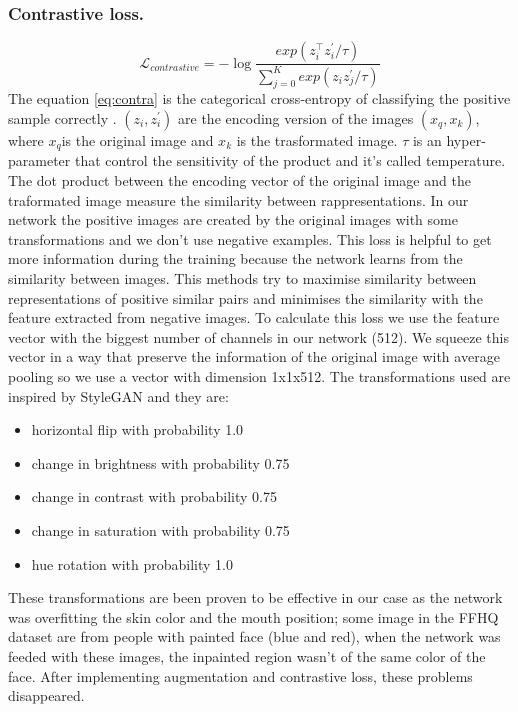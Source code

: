\documentclass[10pt,twocolumn,letterpaper]{article}
\begin{document}
\subsubsection{Contrastive loss.}
\begin{dmath}\label{eq:contra}
    \mathcal{L}_{contrastive} = - \log{\frac{exp(z_{i}^\intercal
    z_{i}^{'}/\tau)}{\sum_{j=0}^{K}exp(z_{i}z_{j}^{'}/\tau)}}
\end{dmath}
The equation \eqref{eq:contra} is the categorical cross-entropy of classifying
the positive sample correctly \cite{oord2018representation}. \((z_{i},
z_{i}^{'})\) are the encoding version of the images \((x_{q}, x_{k})\), where
\(x_{q}\)is the original image and \(x_{k}\) is the trasformated image. \(\tau\)
is an hyper-parameter that control the sensitivity of the product and it's
called temperature. The dot product between the encoding vector of the original
image and the traformated image measure the similarity between rappresentations.
In our network the positive images are created by the original images with some
transformations and we don't use negative examples. This loss is helpful to get
more information during the training because the network learns from the
similarity between images. This methods try to maximise similarity between
representations of positive similar pairs and minimises the similarity with the
feature extracted from negative images\cite{le2020contrastive}.
To calculate this loss we use the feature vector with the biggest number of
channels in our network (512). We squeeze this vector in a way that preserve the
information of the original image with average pooling so we use a vector with
dimension 1x1x512. The transformations used are inspired by
StyleGAN\cite{karras2020analyzing} and they are:
\begin{itemize}
  \item horizontal flip with probability 1.0
  \item change in brightness with probability 0.75
  \item change in contrast with probability 0.75
  \item change in saturation with probability 0.75
  \item hue rotation with probability 1.0
\end{itemize}
These transformations are been proven to be effective in our case as the network
was overfitting the skin color and the mouth position; some image in the FFHQ
dataset are from people with painted face (blue and red), when the network was
feeded with these images, the inpainted region wasn't of the same color of the
face. After implementing augmentation and contrastive loss, these problems
disappeared.
\end{document}
